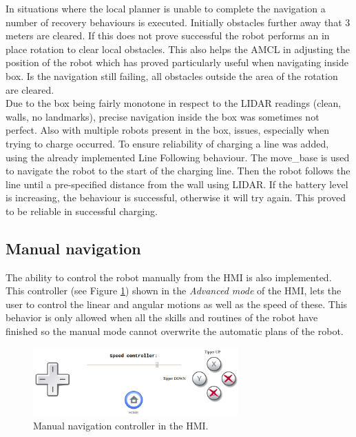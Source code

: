 	In situations where the local planner is unable to complete the navigation a number of recovery behaviours is executed. Initially obstacles further away that 3 meters are cleared. If this does not prove successful the robot performs an in place rotation to clear local obstacles. This also helps the AMCL in adjusting the position of the robot which has proved particularly useful when navigating inside box. Is the navigation still failing, all obstacles outside the area of the rotation are cleared. 
    \\
    Due to the box being fairly monotone in respect to the LIDAR readings (clean, walls, no landmarks), precise navigation inside the box was sometimes not perfect. 
    Also with multiple robots present in the box, issues, especially when trying to charge occurred. 
    To ensure reliability of charging a line was added, using the already implemented Line Following behaviour. 
    The move{\_}base is used to navigate the robot to the start of the charging line. 
    Then the robot follows the line until a pre-specified distance from the wall using LIDAR. 
    If the battery level is increasing, the behaviour is successful, otherwise it will try again. This proved to be reliable in successful charging.\\

    \subsection{Manual navigation} %
    \label{sub:mr_manual_navigation}
    The ability to control the robot manually from the HMI is also implemented.
    This controller (see Figure \ref{fig:mr_manual_navigation}) shown in the \emph{Advanced mode} of the HMI, lets the user to control the linear and angular motions as well as the speed of these.
    This behavior is only allowed when all the skills and routines of the robot have finished so the manual mode cannot overwrite the automatic plans of the robot.

    \begin{figure}[H]
        \centering
        \includegraphics[width=0.7\textwidth]{figs/manual_navigation}
        \caption{Manual navigation controller in the HMI.}
        \label{fig:mr_manual_navigation}
    \end{figure}
    

